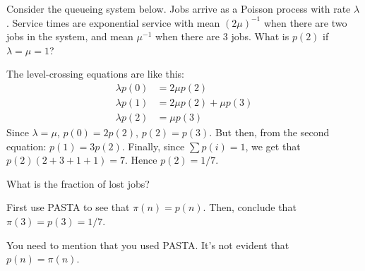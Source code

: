 \begin{exercise}[201807]\label{ex:86}
Consider the queueing system below. Jobs arrive as a Poisson process with rate $\lambda$. Service times are exponential service with mean $(2\mu)^{-1}$ when there are two jobs in the system, and mean $\mu^{-1}$ when there are 3 jobs. What is $p(2)$ if $\lambda=\mu=1$?

\begin{center}
\end{center}


\begin{solution}
The level-crossing equations are like this:
 \begin{align*}
 \lambda p(0) &= 2\mu p(2) \\
 \lambda p(1) &= 2\mu p(2) +\mu p(3) \\
 \lambda p(2) &= \mu p(3) 
 \end{align*}
Since $\lambda=\mu$, $p(0) = 2p(2)$, $p(2) = p(3)$. But then, from the second equation: $p(1) = 3p(2)$. Finally, since $\sum p(i) = 1$, we get that $p(2)(2+3+1+1)=7$. Hence $p(2)=1/7$. 
\end{solution}
\end{exercise}


\begin{exercise}[201807] 
What is the fraction of lost jobs?
\begin{solution}
 First use PASTA to see that $\pi(n) = p(n)$. Then, conclude that $\pi(3) = p(3) = 1/7$. 

You need to mention that you used PASTA. It's not evident that $p(n)=\pi(n)$. 
\end{solution}
\end{exercise}

